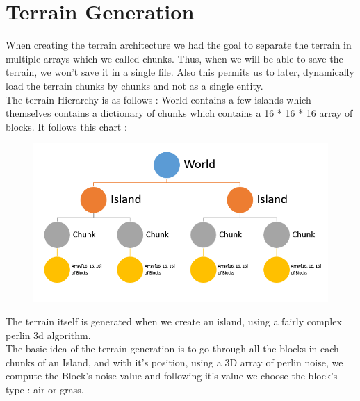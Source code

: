 \documentclass[article]{report} %
\begin{document}
			\section{Terrain Generation}
				When creating the terrain architecture we had the goal to separate the terrain in multiple arrays which we called chunks. Thus, when we will be able to save the terrain, we won't save it in a single file. Also this permits us to later, dynamically load the terrain chunks by chunks and not as a single entity. \\
				The terrain Hierarchy is as follows : World contains a few islands which themselves contains a dictionary of chunks which contains a 16 * 16 * 16 array of blocks. It follows this chart : 
				\begin{figure}[h]
					\includegraphics[width=18cm]{images/Schemas/WorldHierarchy.png}
				\end{figure}

				The terrain itself is generated when we create an island, using a fairly complex perlin 3d algorithm. \\
				The basic idea of the terrain generation is to go through all the blocks in each chunks of an Island, and with it's position,  using a 3D array of perlin noise, we compute the Block's noise value and following it's value we choose the block's type : air or grass.
\newpage
\end{document}
